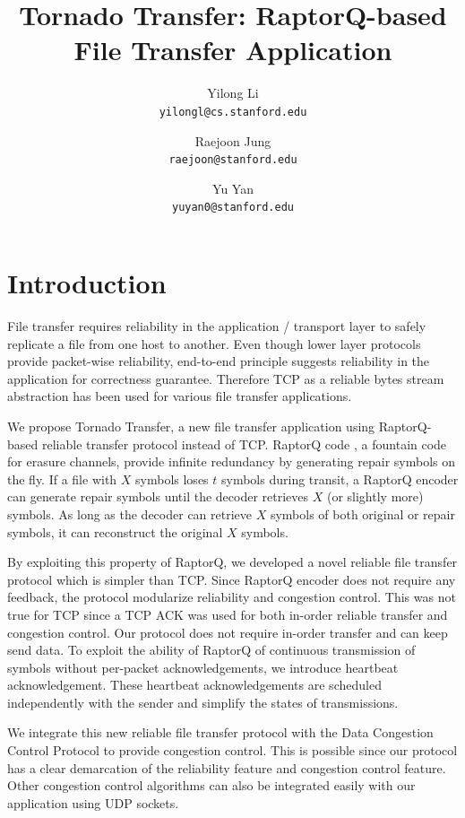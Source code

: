 \documentclass{sig-alternate-10pt}
\begin{document}
\title{Tornado Transfer: RaptorQ-based File Transfer Application} 
\author{ 
Yilong Li\\
\texttt{yilongl@cs.stanford.edu} \and 
Raejoon Jung\\
\texttt{raejoon@stanford.edu} \and 
Yu Yan\\ 
\texttt{yuyan0@stanford.edu} 
}

\maketitle 

\section{Introduction}
File transfer requires reliability in the application / transport layer to safely
replicate a file from one host to another. Even though lower layer protocols
provide packet-wise reliability, end-to-end principle suggests
reliability in the application for correctness guarantee. Therefore TCP as a
reliable bytes stream abstraction has been used for various file transfer
applications.

We propose Tornado Transfer, a new file transfer application using RaptorQ-based reliable
transfer protocol instead of TCP. RaptorQ code \cite{raptorq}, a fountain code
for erasure channels, provide infinite redundancy by generating repair symbols
on the fly. If a file with $X$ symbols loses $t$ symbols during transit, a
RaptorQ encoder can generate repair symbols until the decoder retrieves $X$ (or
slightly more) symbols. As long as the decoder can retrieve $X$ symbols of both
original or repair symbols, it can reconstruct the original $X$ symbols.

By exploiting this property of RaptorQ, we developed a novel reliable file
transfer protocol which is simpler than TCP. Since RaptorQ encoder does not
require any feedback, the protocol modularize reliability and congestion
control. This was not true for TCP since a TCP ACK was used for both in-order
reliable transfer and congestion control. Our protocol does not require in-order
transfer and can keep send data. To exploit the ability of RaptorQ of continuous
transmission of symbols without per-packet acknowledgements, we introduce
heartbeat acknowledgement. These heartbeat acknowledgements are scheduled
independently with the sender and simplify the states of transmissions. 

We integrate this new reliable file transfer protocol with the Data Congestion
Control Protocol to provide congestion control. This is possible since our
protocol has a clear demarcation of the reliability feature and congestion
control feature. Other congestion control algorithms can also be integrated
easily with our application using UDP sockets.
\end{document}
